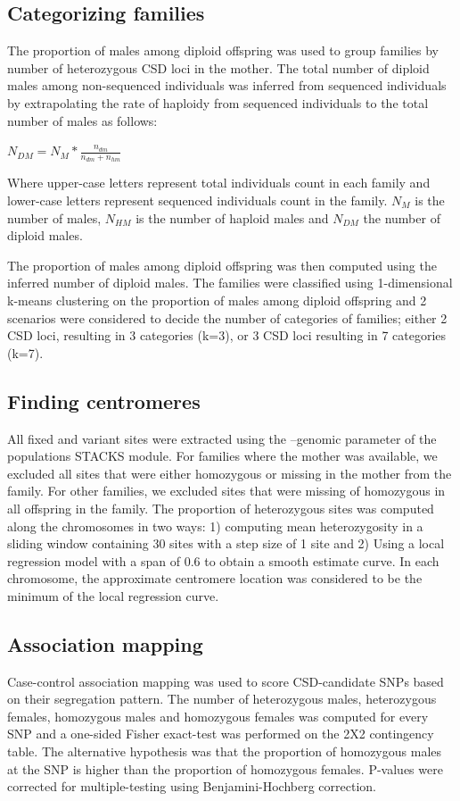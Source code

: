 \documentclass[11pt,a4paper]{report}
\begin{document}
\subsection*{Categorizing families}
The proportion of males among diploid offspring was used to group families by number of heterozygous CSD loci in the mother. The total number of diploid males among non-sequenced individuals was inferred from sequenced individuals by extrapolating the rate of haploidy from sequenced individuals to the total number of males as follows:
\begin{center}
$N_{DM}=N_M*\frac{n_{dm}}{n_{dm}+n_{hm}}$\\
\end{center}
Where upper-case letters represent total individuals count in each family and lower-case letters represent sequenced individuals count in the family. $N_M$ is the number of males, $N_{HM}$ is the number of haploid males and $N_{DM}$ the number of diploid males.

The proportion of males among diploid offspring was then computed using the inferred number of diploid males. The families were classified using 1-dimensional k-means clustering on the proportion of males among diploid offspring and 2 scenarios were considered to decide the number of categories of families; either 2 CSD loci, resulting in 3 categories (k=3), or 3 CSD loci resulting in 7 categories (k=7).\\

\subsection*{Finding centromeres}
All fixed and variant sites were extracted using the --genomic parameter of the populations STACKS module. For families where the mother was available, we excluded all sites that were either homozygous or missing in the mother from the family. For other families, we excluded sites that were missing of homozygous in all offspring in the family. 
The proportion of heterozygous sites was computed along the chromosomes in two ways: 1) computing mean heterozygosity in a sliding window containing 30 sites with a step size of 1 site and 2) Using a local regression model with a span of 0.6 to obtain a smooth estimate curve. In each chromosome, the approximate centromere location was considered to be the minimum of the local regression curve.

\subsection*{Association mapping}
Case-control association mapping was used to score CSD-candidate SNPs based on their segregation pattern. The number of heterozygous males, heterozygous females, homozygous males and homozygous females was computed for every SNP and a one-sided Fisher exact-test was performed on the 2X2 contingency table. The alternative hypothesis was that the proportion of homozygous males at the SNP is higher than the proportion of homozygous females. P-values were corrected for multiple-testing using Benjamini-Hochberg correction. 
\end{document}
